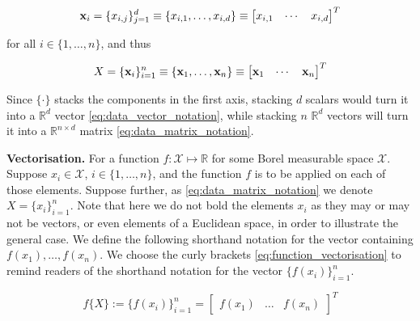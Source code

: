 \documentclass[twoside]{article} \usepackage{aistats2017}
\theoremstyle{definition}
\theoremstyle{definition}
\theoremstyle{remark}
\newcommand{\ds}[1]{{#1}}
\begin{document}
	\begin{equation}
	\mathbf{x}_{i} = \{x_{i, j}\}_{j = 1}^{d} \equiv \{x_{i, 1}, \dots, x_{i, d}\} \equiv \begin{bmatrix}
	x_{i, 1} & \cdots & x_{i, d}
	\end{bmatrix}^{T}
	\label{eq:data_vector_notation}
	\end{equation}
	
	for all $i \in \{1, \dots, n\}$, and thus

	\begin{equation}
		\ds{X} = \{\bvec{x}_{i}\}_{i = 1}^{n} \equiv \{\bvec{x}_{1}, \dots, \bvec{x}_{n}\} \equiv \begin{bmatrix}
			\bvec{x}_{1} & \cdots & \bvec{x}_{n}
		\end{bmatrix}^{T}
	\label{eq:data_matrix_notation}
	\end{equation}
		
	Since $\{ \cdot \}$ stacks the components in the first axis, stacking $d$ scalars would turn it into a $\mathbb{R}^{d}$ vector \eqref{eq:data_vector_notation}, while stacking $n$ $\mathbb{R}^{d}$ vectors will turn it into a $\mathbb{R}^{n \times d}$ matrix \eqref{eq:data_matrix_notation}.
	
	\textbf{Vectorisation.} For a function $f : \mathcal{X} \mapsto \mathbb{R}$ for some Borel measurable space $\mathcal{X}$. Suppose $x_{i} \in \mathcal{X}$, $i \in \{1, \dots, n\}$, and the function $f$ is to be applied on each of those elements. Suppose further, as \eqref{eq:data_matrix_notation} we denote $X = \{x_{i}\}_{i = 1}^{n}$. Note that here we do not bold the elements $x_{i}$ as they may or may not be vectors, or even elements of a Euclidean space, in order to illustrate the general case. We define the following shorthand notation for the vector containing $f(x_{1}), \dots, f(x_{n})$. We choose the curly brackets \eqref{eq:function_vectorisation} to remind readers of the shorthand notation for the vector $\{f(x_{i})\}_{i = 1}^{n}$.
	
	\begin{equation}
		f\{\ds{X}\} := \{f(x_{i})\}_{i = 1}^{n} = {\begin{bmatrix} f(x_{1}) & \dots & f(x_{n}) \end{bmatrix}}^{T}
	\label{eq:function_vectorisation}
	\end{equation}
	
\end{document}
